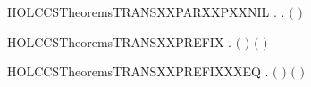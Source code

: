 \newcommand{\HOLCCSTheoremsTRANSXXPARXXNOXXSYNCR}{\UseVerbatim{HOLCCSTheoremsTRANSXXPARXXNOXXSYNCR}}
\begin{SaveVerbatim}{HOLCCSTheoremsTRANSXXPARXXPXXNIL}
\HOLTokenTurnstile{} \HOLSymConst{\HOLTokenForall{}}  .  \HOLSymConst{\ensuremath{\mid}}  \HOLTokenTransBegin{}\HOLTokenTransEnd {} \HOLSymConst{\HOLTokenImp{}} \HOLSymConst{\HOLTokenExists{}}.  \HOLTokenTransBegin{}\HOLTokenTransEnd {} \HOLSymConst{\HOLTokenConj{}} \ensuremath{(} \HOLSymConst{\ensuremath{=}}  \HOLSymConst{\ensuremath{\mid}} \ensuremath{)}
\end{SaveVerbatim}
\newcommand{\HOLCCSTheoremsTRANSXXPARXXPXXNIL}{\UseVerbatim{HOLCCSTheoremsTRANSXXPARXXPXXNIL}}
\begin{SaveVerbatim}{HOLCCSTheoremsTRANSXXPREFIX}
\HOLTokenTurnstile{} \HOLSymConst{\HOLTokenForall{}}   . \HOLSymConst{\ensuremath{\ldotp}} \HOLTokenTransBegin{}\HOLTokenTransEnd {} \HOLSymConst{\HOLTokenImp{}} \ensuremath{(} \HOLSymConst{\ensuremath{=}} \ensuremath{)} \HOLSymConst{\HOLTokenConj{}} \ensuremath{(} \HOLSymConst{\ensuremath{=}} \ensuremath{)}
\end{SaveVerbatim}
\newcommand{\HOLCCSTheoremsTRANSXXPREFIX}{\UseVerbatim{HOLCCSTheoremsTRANSXXPREFIX}}
\begin{SaveVerbatim}{HOLCCSTheoremsTRANSXXPREFIXXXEQ}
\HOLTokenTurnstile{} \HOLSymConst{\HOLTokenForall{}}   . \HOLSymConst{\ensuremath{\ldotp}} \HOLTokenTransBegin{}\HOLTokenTransEnd {} \HOLSymConst{\HOLTokenEquiv{}} \ensuremath{(} \HOLSymConst{\ensuremath{=}} \ensuremath{)} \HOLSymConst{\HOLTokenConj{}} \ensuremath{(} \HOLSymConst{\ensuremath{=}} \ensuremath{)}
\end{SaveVerbatim}
\newcommand{\HOLCCSTheoremsTRANSXXPREFIXXXEQ}{\UseVerbatim{HOLCCSTheoremsTRANSXXPREFIXXXEQ}}
